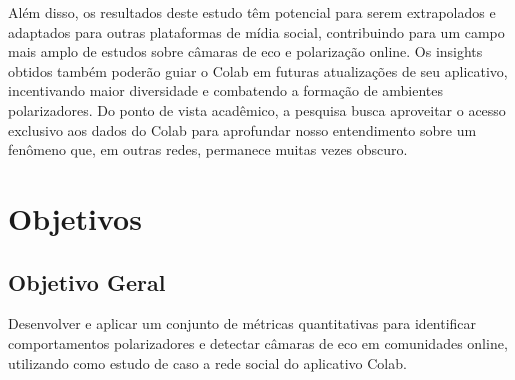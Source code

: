 Além disso, os resultados deste estudo têm potencial para serem extrapolados e adaptados para outras plataformas de mídia social, contribuindo para um campo mais amplo de estudos sobre câmaras de eco e polarização online. Os insights obtidos também poderão guiar o Colab em futuras atualizações de seu aplicativo, incentivando maior diversidade e combatendo a formação de ambientes polarizadores. Do ponto de vista acadêmico, a pesquisa busca aproveitar o acesso exclusivo aos dados do Colab para aprofundar nosso entendimento sobre um fenômeno que, em outras redes, permanece muitas vezes obscuro.

\section{Objetivos}

\subsection{Objetivo Geral}
Desenvolver e aplicar um conjunto de métricas quantitativas para identificar comportamentos polarizadores e detectar câmaras de eco em comunidades online, utilizando como estudo de caso a rede social do aplicativo Colab.

